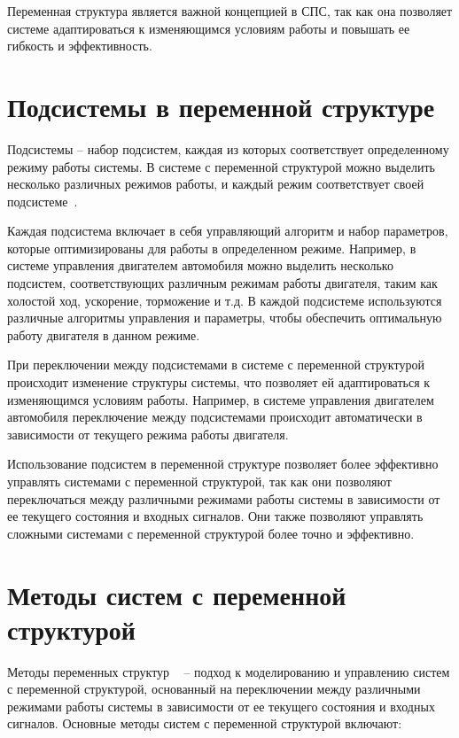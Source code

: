 Переменная структура является важной концепцией в СПС, так как она позволяет системе адаптироваться к изменяющимся условиям работы и повышать ее гибкость и эффективность.

\section{Подсистемы в переменной структуре}

Подсистемы -- набор подсистем, каждая из которых соответствует определенному режиму работы системы. В системе с переменной структурой можно выделить несколько различных режимов работы, и каждый режим соответствует своей подсистеме~\cite{6}. 

Каждая подсистема включает в себя управляющий алгоритм и набор параметров, которые оптимизированы для работы в определенном режиме. Например, в системе управления двигателем автомобиля можно выделить несколько подсистем, соответствующих различным режимам работы двигателя, таким как холостой ход, ускорение, торможение и т.д. В каждой подсистеме используются различные алгоритмы управления и параметры, чтобы обеспечить оптимальную работу двигателя в данном режиме. 

При переключении между подсистемами в системе с переменной структурой происходит изменение структуры системы, что позволяет ей адаптироваться к изменяющимся условиям работы. Например, в системе управления двигателем автомобиля переключение между подсистемами происходит автоматически в зависимости от текущего режима работы двигателя.

Использование подсистем в переменной структуре позволяет более эффективно управлять системами с переменной структурой, так как они позволяют переключаться между различными режимами работы системы в зависимости от ее текущего состояния и входных сигналов. Они также позволяют управлять сложными системами с переменной структурой более точно и эффективно.

\section{Методы систем с переменной структурой}

Методы переменных структур ~\cite{7} -- подход к моделированию и управлению систем с переменной структурой, основанный на переключении между различными режимами работы системы в зависимости от ее текущего состояния и входных сигналов. Основные методы систем с переменной структурой включают:

